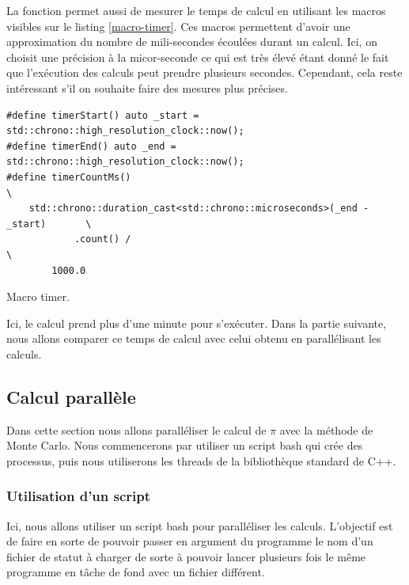 \documentclass[a4paper]{article}
\begin{document}
La fonction permet aussi de mesurer le temps de calcul en utilisant les macros
visibles sur le listing \ref{macro-timer}. Ces macros permettent d'avoir une
approximation du nombre de mili-secondes écoulées durant un calcul. Ici, on
choisit une précision à la micor-seconde ce qui est très élevé étant donné le
fait que l'exécution des calculs peut prendre plusieurs secondes. Cependant,
cela reste intéressant s'il on souhaite faire des mesures plus précises.

\begin{listing}[ht!]
\begin{verbatim}
#define timerStart() auto _start = std::chrono::high_resolution_clock::now();
#define timerEnd() auto _end = std::chrono::high_resolution_clock::now();
#define timerCountMs()                                                         \
    std::chrono::duration_cast<std::chrono::microseconds>(_end - _start)       \
            .count() /                                                         \
        1000.0
\end{verbatim}
\caption{Macro timer.}
\label{macro-timer}
\end{listing}

Ici, le calcul prend plus d'une minute pour s'exécuter. Dans la partie suivante,
nous allons comparer ce temps de calcul avec celui obtenu en parallélisant les
calculs.

\subsection{Calcul parallèle}

Dans cette section nous allons paralléliser le calcul de $\pi$ avec la méthode
de Monte Carlo. Nous commencerons par utiliser un script bash qui crée des
processus, puis nous utiliserons les threads de la bibliothèque standard de C++.

\subsubsection{Utilisation d'un script}
\label{sec:script}

Ici, nous allons utiliser un script bash pour paralléliser les calculs.
L'objectif est de faire en sorte de pouvoir passer en argument du programme le
nom d'un fichier de statut à charger de sorte à pouvoir lancer plusieurs fois le
même programme en tâche de fond avec un fichier différent.\\
\end{document}

